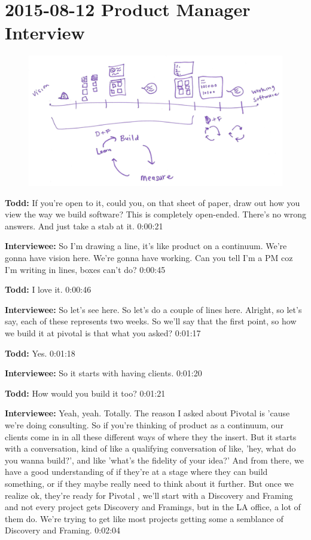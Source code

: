 \section{2015-08-12 Product Manager Interview}

\begin{figure}[h]
\centering
\includegraphics[width=6.5in]{interviews/2015_08_12_pm.png}
\caption{}
\label{2015_08_12_pm}
\end{figure}


\textbf{Todd:} If you're open to it, could you, on that sheet of paper, draw out how you view the way we build software? This is completely open-ended. There's no wrong answers. And just take a stab at it.  0:00:21

\textbf{Interviewee:} So I'm drawing a line, it's like product on a continuum. We're gonna have vision here. We're gonna have working. Can you tell I'm a PM coz I'm writing in lines, boxes can't do? 0:00:45

\textbf{Todd:} I love it.  0:00:46

\textbf{Interviewee:} So let's see here. So let's do a couple of lines here. Alright, so let's say, each of these represents two weeks.  So we'll say that the first point, so how we build it at pivotal is that what you asked?  0:01:17

\textbf{Todd:} Yes.  0:01:18

\textbf{Interviewee:} So it starts with having clients.  0:01:20

\textbf{Todd:} How would you build it too?  0:01:21

\textbf{Interviewee:} Yeah, yeah. Totally. The reason I asked about Pivotal is 'cause we're doing consulting. So if you're thinking of product as a continuum, our clients come in in all these different ways of where they the insert. But it starts with a conversation, kind of like a qualifying conversation of like, 'hey, what do you wanna build?', and like 'what's the fidelity of your idea?' And from there, we have a good understanding of if they're at a stage where they can build something, or if they maybe really need to think about it further.  But once we realize ok, they're ready for Pivotal , we'll start with a Discovery and Framing and not every project gets Discovery and Framings, but in the LA office, a lot of them do.  We're trying to get like most projects getting some a semblance of Discovery and Framing.   0:02:04

